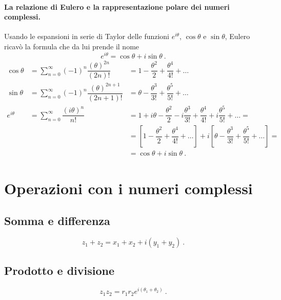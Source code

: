 \paragraph{La relazione di Eulero e la rappresentazione polare dei numeri complessi.} Usando le espansioni in serie di Taylor delle funzioni $e^{i\theta}$, $\cos \theta$ e $\sin \theta$, Eulero ricavò la formula che da lui prende il nome
\begin{equation}
  e^{i \theta} = \cos \theta + i \sin \theta \ .
\end{equation}
\begin{equation}
\begin{array}{rll}
   \cos \theta  & = \sum_{n=0}^{\infty} (-1)^n \dfrac{(\theta)^{2n}}{(2n)!} & = 1 - \dfrac{\theta^2}{2} + \dfrac{\theta^4}{4!} + \dots \\
   \sin \theta  & = \sum_{n=0}^{\infty} (-1)^n \dfrac{(\theta)^{2n+1}}{(2n+1)!} & = \theta - \dfrac{\theta^3}{3!} + \dfrac{\theta^5}{5!} + \dots \\
   e^{i \theta} & = \sum_{n=0}^{\infty} \dfrac{(i\theta)^n}{n!} & = 1 + i\theta - \dfrac{\theta^2}{2} - i \dfrac{\theta^3}{3!} + \dfrac{\theta^4}{4!} + i \dfrac{\theta^5}{5!} +  \dots = \\
  & & = \left[  1 - \dfrac{\theta^2}{2} + \dfrac{\theta^4}{4!} + \dots \right] + i \left[ \theta - \dfrac{\theta^3}{3!} + \dfrac{\theta^5}{5!} + \dots \right]  = \\
  & & = \cos \theta + i \sin \theta \ .
\end{array}
\end{equation}

\section{Operazioni con i numeri complessi}

\subsection{Somma e differenza}
\begin{equation}
   z_1 + z_2 = x_1 + x_2 + i (y_1 + y_2) \ .
\end{equation}

\subsection{Prodotto e divisione}
\begin{equation}
   z_1 z_2 = r_1 r_2 e^{i(\theta_1+\theta_2)} \ .
\end{equation}

